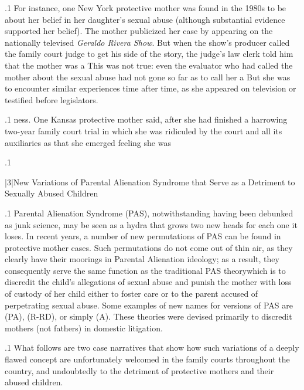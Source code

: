 \documentclass[11pt, twoside]{article}
\begin{document}
{\p.1{%
For instance, one New York protective mother was found in the
1980s to be  about her belief in her daughter’s sexual abuse
(although substantial evidence supported her belief). The mother publicized her case by appearing on the nationally
televised \textit{Geraldo Rivera Show}. But
when the show’s producer called the family court judge to get
his side of the story, the judge’s law clerk told him that the mother was a
 This was not true: even the evaluator who had
called the mother  about the sexual abuse had not gone so far
as to call her a  But she was to encounter
similar experiences time after time, as she appeared on television or
testified before legislators.
}%

\p.1{%
ness. One Kansas protective mother said, after she had finished a
harrowing two-year family court trial in which she was ridiculed by
the court and all its auxiliaries as  that she emerged
feeling she was 
}%

\p.1{%
\writeAddendum{}
}%


\s|3|{New Variations of Parental Alienation Syndrome that Serve as a Detriment to Sexually Abused Children}

\p.1{%
\noindent{}Parental Alienation Syndrome (PAS), notwithstanding
having been debunked as junk science, may
be seen as a hydra that grows two new heads for each one it loses. In
recent years, a number of new permutations of PAS can be found in
protective mother cases. Such permutations do not come out of thin air,
as they clearly have their moorings in Parental Alienation ideology; as a
result, they consequently serve the same function as the traditional PAS
theory\mdash{}which is to discredit the child’s allegations of sexual abuse and
punish the mother with loss of custody of her child either to foster care
or to the parent accused of perpetrating sexual abuse. Some examples
of new names for versions of PAS are  (PA),  (R-RD), or simply  (A). These
theories were devised primarily to discredit mothers (not fathers) in
domestic litigation.
}%

\p.1{%
What follows are two case narratives that show how such variations of
a deeply flawed concept are unfortunately welcomed in the family courts
throughout the country, and undoubtedly to the detriment of protective
mothers and their abused children.
}%


}
\end{document}
